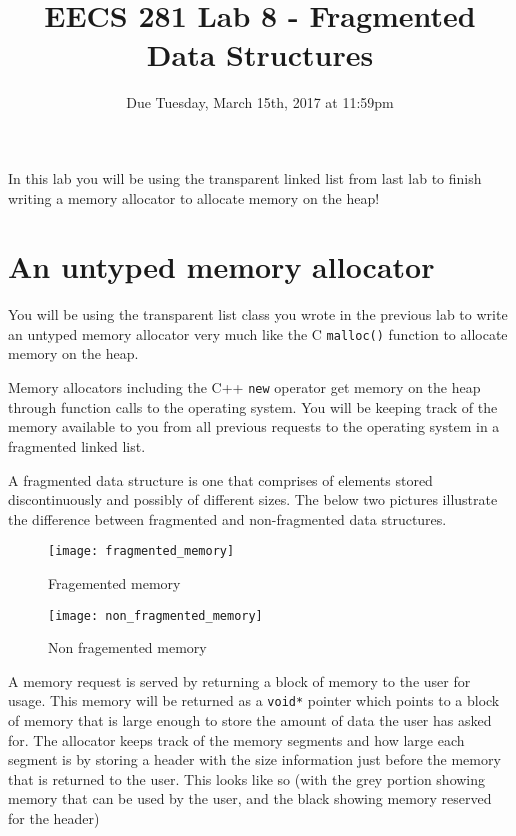 \documentclass{article}
\begin{document}
\title{\textbf{EECS 281 Lab 8 - Fragmented Data Structures}}
\author{Due Tuesday, March 15th, 2017 at 11:59pm}
\date{}
\maketitle
{}
{
   \pagestyle{empty}
}
\thispagestyle{firststyle}

In this lab you will be using the transparent linked list from last lab to
finish writing a memory allocator to allocate memory on the heap!

\section{An untyped memory allocator}
You will be using the transparent list class you wrote in the previous lab to
write an untyped memory allocator very much like the C \texttt{malloc()}
function to allocate memory on the heap.

Memory allocators including the C++ \texttt{new} operator get memory on the
heap through function calls to the operating system.  You will be keeping
track of the memory available to you from all previous requests to the
operating system in a fragmented linked list.

A fragmented data structure is one that comprises of elements stored
discontinuously and possibly of different sizes.  The below two pictures
illustrate the difference between fragmented and non-fragmented data
structures.

\begin{figure}[!htb]
\centering
\texttt{[image: fragmented\_memory]}
\caption{Fragemented memory}
\end{figure}

\begin{figure}[!htb]
\centering
\texttt{[image: non\_fragmented\_memory]}
\caption{Non fragemented memory}
\end{figure}

A memory request is served by returning a block of memory to the user for
usage.  This memory will be returned as a \texttt{void*} pointer which points
to a block of memory that is large enough to store the amount of data the user
has asked for.  The allocator keeps track of the memory segments and how large
each segment is by storing a header with the size information just before the
memory that is returned to the user.  This looks like so (with the grey
portion showing memory that can be used by the user, and the black showing
memory reserved for the header)
\end{document}
